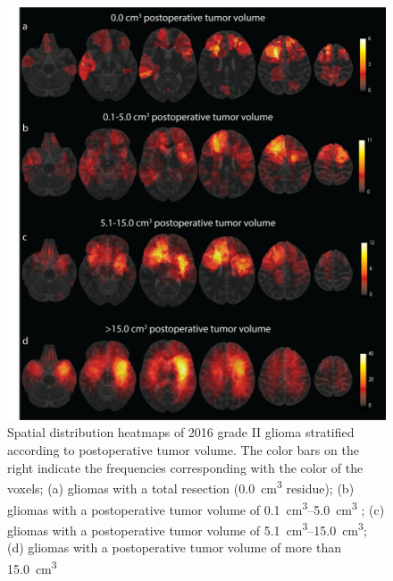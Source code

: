 \begin{figure}[htbp]
\centering
\includegraphics[width=\textwidth]{Figures/Figure_3.png}
\caption{Spatial distribution heatmaps of  2016 grade II glioma stratified according to postoperative \gls{tumor} volume. The color bars on the right
indicate the frequencies corresponding with the color of the voxels; (a) gliomas with a total resection (\SI{0.0}{\cubic\centi\metre} residue); (b) gliomas with a postoperative \gls{tumor} volume of \SIrange{0.1}{5.0}{\cubic\centi\metre} ; (c) gliomas with a postoperative \gls{tumor} volume of  \SIrange{5.1}{15.0}{\cubic\centi\metre}; (d) gliomas with a postoperative \gls{tumor} volume
of more than \SI{15.0}{\cubic\centi\metre}}\label{fig:LGG_location_postop_volume}
\end{figure}


